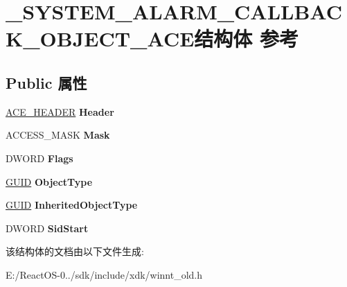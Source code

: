 \hypertarget{struct___s_y_s_t_e_m___a_l_a_r_m___c_a_l_l_b_a_c_k___o_b_j_e_c_t___a_c_e}{}\section{\+\_\+\+S\+Y\+S\+T\+E\+M\+\_\+\+A\+L\+A\+R\+M\+\_\+\+C\+A\+L\+L\+B\+A\+C\+K\+\_\+\+O\+B\+J\+E\+C\+T\+\_\+\+A\+C\+E结构体 参考}
\label{struct___s_y_s_t_e_m___a_l_a_r_m___c_a_l_l_b_a_c_k___o_b_j_e_c_t___a_c_e}
\subsection*{Public 属性}
\begin{DoxyCompactItemize}
\item 
\mbox{\label{struct___s_y_s_t_e_m___a_l_a_r_m___c_a_l_l_b_a_c_k___o_b_j_e_c_t___a_c_e_ae38a718fbbc097ce4c838ebdb43c63eb}} 
\hyperlink{struct___a_c_e___h_e_a_d_e_r}{A\+C\+E\+\_\+\+H\+E\+A\+D\+ER} {\bfseries Header}
\item 
\mbox{\label{struct___s_y_s_t_e_m___a_l_a_r_m___c_a_l_l_b_a_c_k___o_b_j_e_c_t___a_c_e_a13a36ee67a72b08cbd0f791642845f9b}} 
A\+C\+C\+E\+S\+S\+\_\+\+M\+A\+SK {\bfseries Mask}
\item 
\mbox{\label{struct___s_y_s_t_e_m___a_l_a_r_m___c_a_l_l_b_a_c_k___o_b_j_e_c_t___a_c_e_a346b8fd3a67674b5f11a181f3710935a}} 
D\+W\+O\+RD {\bfseries Flags}
\item 
\mbox{\label{struct___s_y_s_t_e_m___a_l_a_r_m___c_a_l_l_b_a_c_k___o_b_j_e_c_t___a_c_e_a7b22a33f7c250d3aa0da1a28a9956ebe}} 
\hyperlink{interface_g_u_i_d}{G\+U\+ID} {\bfseries Object\+Type}
\item 
\mbox{\label{struct___s_y_s_t_e_m___a_l_a_r_m___c_a_l_l_b_a_c_k___o_b_j_e_c_t___a_c_e_a8de19cdebd08aefc6e72454f527d902d}} 
\hyperlink{interface_g_u_i_d}{G\+U\+ID} {\bfseries Inherited\+Object\+Type}
\item 
\mbox{\label{struct___s_y_s_t_e_m___a_l_a_r_m___c_a_l_l_b_a_c_k___o_b_j_e_c_t___a_c_e_af63c75e7a5958849dfefe9b2f59df1ae}} 
D\+W\+O\+RD {\bfseries Sid\+Start}
\end{DoxyCompactItemize}


该结构体的文档由以下文件生成\+:\begin{DoxyCompactItemize}
\item 
E\+:/\+React\+O\+S-\/0../sdk/include/xdk/winnt\+\_\+old.\+h\end{DoxyCompactItemize}
